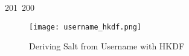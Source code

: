 201~200~\documentclass{article}
\begin{document}
	                                                                                                                                                                                                                                                                                                	                                                                                                                                        	    	                                                                                                	                                                                                                                                                                                                                                                                        \begin{figure}[h]
	                                                                                                                                                                                                                                                                                                	                                                                                                                                        	    	                                                                                                	                                                                                                                                                                                                                                                                            \centering
	                                                                                                                                                                                                                                                                                                	                                                                                                                                        	    	                                                                                                	                                                                                                                                                                                                                                                                                \texttt{[image: username\_hkdf.png]}
	                                                                                                                                                                                                                                                                                                	                                                                                                                                        	    	                                                                                                	                                                                                                                                                                                                                                                                                    \caption{Deriving Salt from Username with HKDF}

\end{figure}
\end{document}
